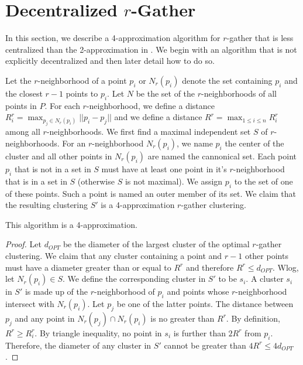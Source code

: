 \section{Decentralized $r$-Gather}

In this section, we describe a 4-approximation algorithm for $r$-gather that is less centralized than the 2-approximation in \cite{Aggarwal06achievinganonymity}.  We begin with an algorithm that is not explicitly decentralized and then later detail how to do so.

Let the $r$-neighborhood of a point $p_i$ or $N_r(p_i)$ denote the set containing $p_i$ and the closest $r-1$ points to $p_i$.  Let $N$ be the set of the $r$-neighborhoods of all points in $P$.  For each $r$-neighborhood, we define a distance $R_i^r = \max_{p_j \in N_r(p_i)}||p_i - p_j||$ and we define a distance $R^r = \max_{1 \leq i \leq n}R_i^r$ among all $r$-neighborhoods.  We first find a maximal independent set $S$ of $r$-neighborhoods.  For an $r$-neighborhood $N_r(p_i)$, we name $p_i$ the center of the cluster and all other points in $N_r(p_i)$ are named the cannonical set.  Each point $p_i$ that is not in a set in $S$ must have at least one point in it's $r$-neighborhood that is in a set in $S$ (otherwise $S$ is not maximal).  We assign $p_i$ to the set of one of these points.  Such a point is named an outer member of its set.  We claim that the resulting clustering $S'$ is a 4-approximation $r$-gather clustering.  

\begin{theorem}
This algorithm is a 4-approximation.
\end{theorem}

\begin{proof}
Let $d_{OPT}$ be the diameter of the largest cluster of the optimal $r$-gather clustering.  We claim that any cluster containing a point and $r-1$ other points must have a diameter greater than or equal to $R^r$ and therefore $R^r \leq d_{OPT}$.  Wlog, let $N_r(p_i) \in S$.  We define the corresponding cluster in $S'$ to be $s_i$.  A cluster $s_i$ in $S'$ is made up of the $r$-neighborhood of $p_i$ and points whose $r$-neighborhood intersect with $N_r(p_i)$.  Let $p_j$ be one of the latter points.  The distance between $p_j$ and any point in $N_r(p_j) \cap N_r(p_i)$ is no greater than $R^r$.  By definition, $R^r \geq R_i^r$.  By triangle inequality, no point in $s_i$ is further than $2R^r$ from $p_i$.  Therefore, the diameter of any cluster in $S'$ cannot be greater than $4R^r \leq 4d_{OPT}$.
\end{proof}

